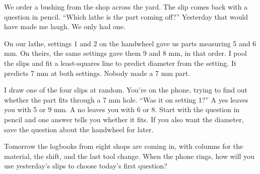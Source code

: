 We order a bushing from the shop across the yard. The slip comes back with a question in pencil. “Which lathe is the part coming off?” Yesterday that would have made me laugh. We only had one.

On our lathe, settings 1 and 2 on the handwheel gave us parts measuring 5 and 6 mm. On theirs, the same settings gave them 9 and 8 mm, in that order. I pool the slips and fit a least-squares line to predict diameter from the setting. It predicts 7 mm at both settings. Nobody made a 7 mm part.

I draw one of the four slips at random. You're on the phone, trying to find out whether the part fits through a 7 mm hole. “Was it on setting 1?” A yes leaves you with 5 or 9 mm. A no leaves you with 6 or 8. Start with the question in pencil and one answer tells you whether it fits. If you also want the diameter, save the question about the handwheel for later.

Tomorrow the logbooks from eight shops are coming in, with columns for the material, the shift, and the last tool change. When the phone rings, how will you use yesterday's slips to choose today's first question?
